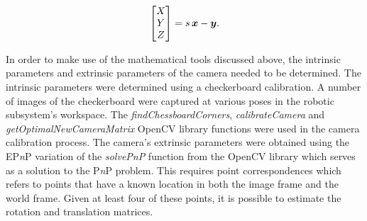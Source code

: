 \begin{equation}
	\begin{bmatrix}
		X \\ 
		Y \\ 
		Z
	\end{bmatrix}=
	s\,\bm{x}-\bm{y}.
	\label{eqn:expanded-pinhole-camera-mapping-final}
\end{equation}


%

In order to make use of the mathematical tools discussed above, the intrinsic parameters and extrinsic parameters of the camera needed to be determined. The intrinsic parameters were determined using a checkerboard calibration. A number of images of the checkerboard were captured at various poses in the robotic subsystem's workspace. The \textit{findChessboardCorners}, \textit{calibrateCamera} and \textit{getOptimalNewCameraMatrix} OpenCV library functions were used in the camera calibration process. The camera's extrinsic parameters were obtained using the EP\textit{n}P variation of the \textit{solvePnP} function from the OpenCV library which serves as a solution to the P\textit{n}P problem. This requires point correspondences which refers to points that have a known location in both the image frame and the world frame. Given at least four of these points, it is possible to estimate the rotation and translation matrices.


